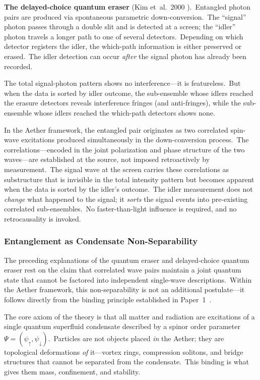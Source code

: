 ﻿\documentclass[12pt,letterpaper]{article}
\begin{document}
\textbf{The delayed-choice quantum eraser} (Kim et~al.\ 2000
\cite{kim2000}).\ Entangled photon pairs are produced via spontaneous parametric
down-conversion.\ The ``signal'' photon passes through a double slit and is
detected at a screen; the ``idler'' photon travels a longer path to one of
several detectors.\ Depending on which detector registers the idler, the
which-path information is either preserved or erased.\ The idler detection
can occur \emph{after} the signal photon has already been recorded.

The total signal-photon pattern shows no interference---it is featureless.\
But when the data is sorted by idler outcome, the sub-ensemble whose idlers
reached the erasure detectors reveals interference fringes (and anti-fringes),
while the sub-ensemble whose idlers reached the which-path detectors shows
none.

In the Aether framework, the entangled pair originates as two correlated
spin-wave excitations produced simultaneously in the down-conversion process.\
The correlations---encoded in the joint polarization and phase structure of
the two waves---are established at the source, not imposed retroactively by
measurement.\ The signal wave at the screen carries these correlations as
substructure that is invisible in the total intensity pattern but becomes
apparent when the data is sorted by the idler's outcome.\ The idler
measurement does not \emph{change} what happened to the signal; it
\emph{sorts} the signal events into pre-existing correlated sub-ensembles.\
No faster-than-light influence is required, and no retrocausality is invoked.

\subsubsection{Entanglement as Condensate Non-Separability}

\label{sec:entanglement-binding}
The preceding explanations of the quantum eraser and delayed-choice quantum eraser
rest on the claim that correlated wave pairs maintain a joint quantum state that
cannot be factored into independent single-wave descriptions.\ Within the Aether
framework, this non-separability is not an additional postulate---it follows
directly from the binding principle established in Paper~1~\cite{otto-overview}.

The core axiom of the theory is that all matter and radiation are excitations of a
single quantum superfluid condensate described by a spinor order parameter
$\Psi = (\psi_\uparrow, \psi_\downarrow)$.\ Particles are not objects placed
\emph{in} the Aether; they are topological deformations \emph{of} it---vortex
rings, compression solitons, and bridge structures that cannot be separated from
the condensate.\ This binding is what gives them mass, confinement, and stability.
\end{document}
